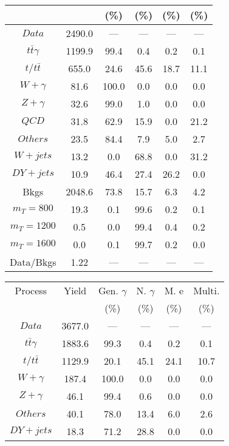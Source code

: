 \begin{figure}
\begin{minipage}[c]{0.32\textwidth}
{\begin{tabular}{cccccc}
 &  & (\%) & (\%) & (\%) & (\%)  \\
\hline
                                                                      $ Data $ &  2490.0 &  --- &  --- &  --- &  ---\\
$ t\bar{t}\gamma $ &  1199.9 &  99.4 &  0.4 &  0.2 &  0.1\\
$ t/t\bar{t} $ &  655.0 &  24.6 &  45.6 &  18.7 &  11.1\\
$ W+\gamma $ &  81.6 &  100.0 &  0.0 &  0.0 &  0.0\\
$ Z+\gamma $ &  32.6 &  99.0 &  1.0 &  0.0 &  0.0\\
$ QCD $ &  31.8 &  62.9 &  15.9 &  0.0 &  21.2\\
$ Others $ &  23.5 &  84.4 &  7.9 &  5.0 &  2.7\\
$ W+jets $ &  13.2 &  0.0 &  68.8 &  0.0 &  31.2\\
$ DY+jets $ &  10.9 &  46.4 &  27.4 &  26.2 &  0.0\\
Bkgs &  2048.6 &  73.8 &  15.7 &  6.3 &  4.2\\
$ m_{T} = 800 $ &  19.3 &  0.1 &  99.6 &  0.2 &  0.1\\
$ m_{T} = 1200 $ &  0.5 &  0.0 &  99.4 &  0.4 &  0.2\\
$ m_{T} = 1600 $ &  0.0 &  0.1 &  99.7 &  0.2 &  0.0\\
Data/Bkgs &  1.22 &  --- &  --- &  --- &  ---\\
\hline
\end{tabular}
}
\end{minipage}
\begin{minipage}[c]{0.32\textwidth}
\centering
\tiny{
\begin{tabular}{cccccc}
\hline
Process & Yield & Gen. $\gamma$ & N. $\gamma$ & M. e & Multi. \\
 &  & (\%) & (\%) & (\%) & (\%)  \\
\hline
                                                                      $ Data $ &  3677.0 &  --- &  --- &  --- &  ---\\
$ t\bar{t}\gamma $ &  1883.6 &  99.3 &  0.4 &  0.2 &  0.1\\
$ t/t\bar{t} $ &  1129.9 &  20.1 &  45.1 &  24.1 &  10.7\\
$ W+\gamma $ &  187.4 &  100.0 &  0.0 &  0.0 &  0.0\\
$ Z+\gamma $ &  46.1 &  99.4 &  0.6 &  0.0 &  0.0\\
$ Others $ &  40.1 &  78.0 &  13.4 &  6.0 &  2.6\\
$ DY+jets $ &  18.3 &  71.2 &  28.8 &  0.0 &  0.0\\

\end{tabular}}
\end{minipage}
\end{figure}
